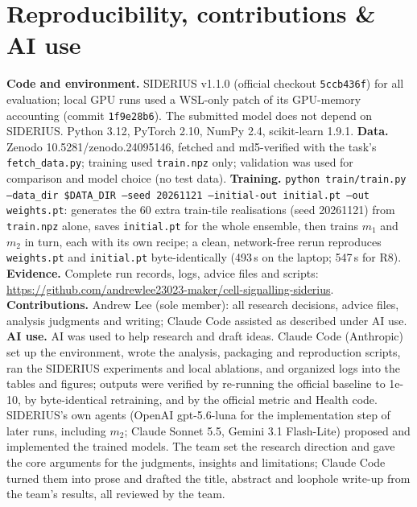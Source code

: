 \documentclass{article}
\begin{document}
\section{Reproducibility, contributions \& AI use}
\textbf{Code and environment.} SIDERIUS v1.1.0 (official checkout \texttt{5ccb436f}) for all evaluation;
local GPU runs used a WSL-only patch of its GPU-memory accounting (commit \texttt{1f9e28b6}). The submitted model does not depend on SIDERIUS. Python 3.12, PyTorch 2.10, NumPy 2.4,
scikit-learn 1.9.1. \textbf{Data.} Zenodo 10.5281/zenodo.24095146, fetched and md5-verified with the task's
\texttt{fetch\_data.py}; training used \texttt{train.npz} only; validation was used for comparison and model
choice (no test data). \textbf{Training.} \texttt{python train/train.py --data\_dir \$DATA\_DIR --seed 20261121
--initial-out initial.pt --out weights.pt}: generates the 60 extra train-tile realisations (seed 20261121) from
\texttt{train.npz} alone, saves \texttt{initial.pt} for the whole ensemble, then trains $m_1$ and $m_2$ in turn, each
with its own recipe; a clean, network-free rerun reproduces \texttt{weights.pt} and \texttt{initial.pt}
byte-identically (493\,s on the laptop; 547\,s for R8).
\textbf{Evidence.} Complete run records, logs, advice files and scripts:
\url{https://github.com/andrewlee23023-maker/cell-signalling-siderius}.
\textbf{Contributions.} Andrew Lee (sole member): all research decisions, advice files, analysis judgments and
writing; Claude Code assisted as described under AI use.
\textbf{AI use.} AI was used to help research and draft ideas. Claude Code (Anthropic) set up the environment, wrote the analysis,
packaging and reproduction scripts, ran the SIDERIUS experiments and local ablations, and organized logs into
the tables and figures; outputs were verified by re-running the official baseline to 1e-10, by
byte-identical retraining, and by the official metric and Health code. SIDERIUS's own agents (OpenAI
gpt-5.6-luna for the implementation step of later runs, including $m_2$; Claude Sonnet 5.5,
Gemini 3.1 Flash-Lite) proposed and implemented the trained models. The team set the research direction and
gave the core arguments for the judgments, insights and limitations; Claude Code turned them into prose and drafted
the title, abstract and loophole write-up from the team's results, all reviewed by the team.

\end{document}
